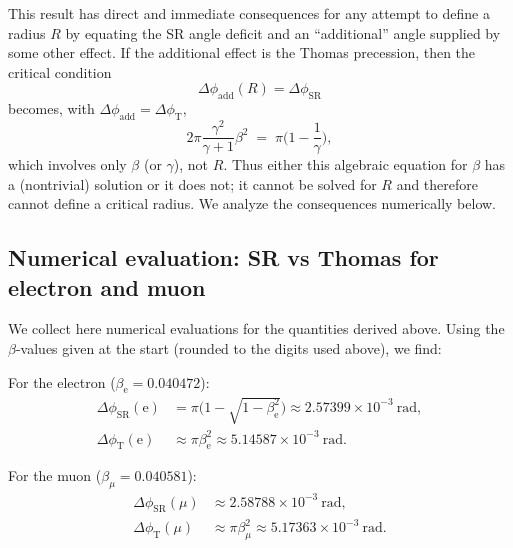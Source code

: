\documentclass[%
 reprint,
 amsmath,amssymb,
 aps,
]{revtex4-1}
\numberwithin{equation}{section}
\begin{document}
This result has direct and immediate consequences for any attempt to define a radius $R$ by equating the SR angle deficit and an ``additional'' angle supplied by some other effect. If the additional effect is the Thomas precession, then the critical condition
\begin{equation}
\Delta\phi_{\mathrm{add}}(R)=\Delta\phi_{\mathrm{SR}}
\label{eq:crit_general}
\end{equation}
becomes, with $\Delta\phi_{\mathrm{add}}=\Delta\phi_{\mathrm{T}}$,
\begin{equation}
2\pi\frac{\gamma^{2}}{\gamma+1}\beta^{2} \;=\; \pi\Big(1-\frac{1}{\gamma}\Big),
\label{eq:crit_thomas_eq}
\end{equation}
which involves only $\beta$ (or $\gamma$), not $R$. Thus either this algebraic equation for $\beta$ has a (nontrivial) solution or it does not; it cannot be solved for $R$ and therefore cannot define a critical radius. We analyze the consequences numerically below.

\subsection{Numerical evaluation: SR vs Thomas for electron and muon}

We collect here numerical evaluations for the quantities derived above. Using the $\beta$-values given at the start (rounded to the digits used above), we find:

For the electron ($\beta_{\mathrm{e}}=0.040472$):
\begin{align}
\Delta\phi_{\mathrm{SR}}(\mathrm{e}) &= \pi\Big(1-\sqrt{1-\beta_{\mathrm{e}}^{2}}\Big)
\approx 2.57399\times 10^{-3}\ \mathrm{rad},
\label{eq:num_SR_e}
\\
\Delta\phi_{\mathrm{T}}(\mathrm{e}) &\approx \pi\beta_{\mathrm{e}}^{2}
\approx 5.14587\times 10^{-3}\ \mathrm{rad}.
\label{eq:num_T_e}
\end{align}

For the muon ($\beta_{\mu}=0.040581$):
\begin{align}
\Delta\phi_{\mathrm{SR}}(\mu) &\approx 2.58788\times 10^{-3}\ \mathrm{rad},
\label{eq:num_SR_mu}
\\
\Delta\phi_{\mathrm{T}}(\mu) &\approx \pi\beta_{\mu}^{2} \approx 5.17363\times 10^{-3}\ \mathrm{rad}.
\label{eq:num_T_mu}
\end{align}
\end{document}
